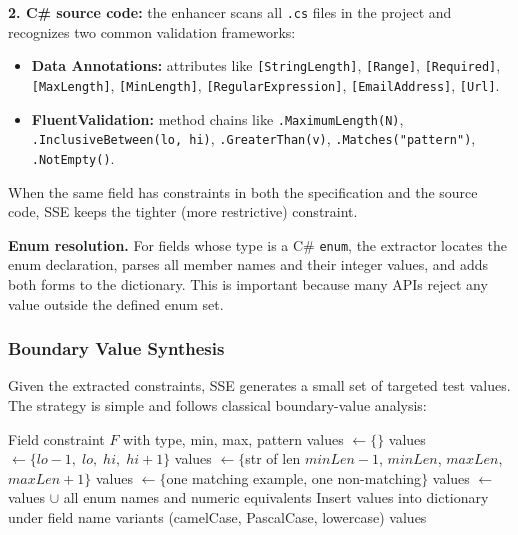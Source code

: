 \documentclass[conference]{IEEEtran}
\begin{document}
\textbf{2. C\# source code:} the enhancer scans all \texttt{.cs} files in the project and recognizes two common validation frameworks:

\begin{itemize}
    \item \textbf{Data Annotations:} attributes like \texttt{[StringLength]}, \texttt{[Range]}, \texttt{[Required]}, \texttt{[MaxLength]}, \texttt{[MinLength]}, \texttt{[RegularExpression]}, \texttt{[EmailAddress]}, \texttt{[Url]}.
    \item \textbf{FluentValidation:} method chains like \texttt{.MaximumLength(N)}, \texttt{.InclusiveBetween(lo, hi)}, \texttt{.GreaterThan(v)}, \texttt{.Matches("pattern")}, \texttt{.NotEmpty()}.
\end{itemize}

When the same field has constraints in both the specification and the source code, SSE keeps the tighter (more restrictive) constraint.

\textbf{Enum resolution.} For fields whose type is a C\# \texttt{enum}, the extractor locates the enum declaration, parses all member names and their integer values, and adds both forms to the dictionary. This is important because many APIs reject any value outside the defined enum set.

\subsubsection{Boundary Value Synthesis}

Given the extracted constraints, SSE generates a small set of targeted test values. The strategy is simple and follows classical boundary-value analysis:

\begin{algorithm}[t]
\caption{Boundary Value Synthesis}
\label{alg:boundary}
\begin{algorithmic}[1]
\REQUIRE Field constraint $F$ with type, min, max, pattern
\STATE values $\leftarrow \{\}$
    \STATE values $\leftarrow \{lo-1,\; lo,\; hi,\; hi+1\}$
    \STATE values $\leftarrow \{$str of len $minLen-1$, $minLen$, $maxLen$, $maxLen+1\}$
    \STATE values $\leftarrow \{$one matching example, one non-matching$\}$
\ENDIF
{}
    \STATE values $\leftarrow$ values $\cup$ all enum names and numeric equivalents
\ENDIF
\STATE Insert values into dictionary under field name variants
\STATE \quad (camelCase, PascalCase, lowercase)
\RETURN values
\end{algorithmic}
\end{algorithm}
\end{document}
